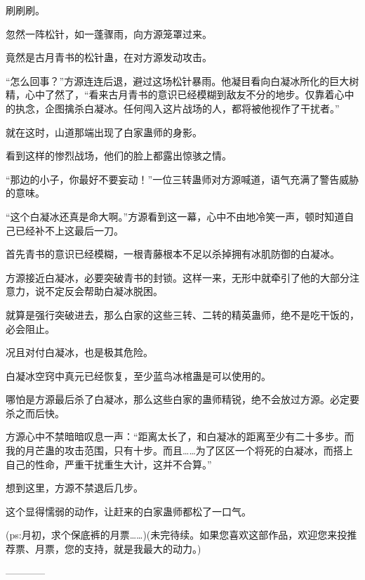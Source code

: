 \begin{this_body}
刷刷刷。

忽然一阵松针，如一蓬骤雨，向方源笼罩过来。

竟然是古月青书的松针蛊，在对方源发动攻击。

“怎么回事？”方源连连后退，避过这场松针暴雨。他凝目看向白凝冰所化的巨大树精，心中了然了，“看来古月青书的意识已经模糊到敌友不分的地步。仅靠着心中的执念，企图擒杀白凝冰。任何闯入这片战场的人，都将被他视作了干扰者。”

就在这时，山道那端出现了白家蛊师的身影。

看到这样的惨烈战场，他们的脸上都露出惊骇之情。

“那边的小子，你最好不要妄动！”一位三转蛊师对方源喊道，语气充满了警告威胁的意味。

“这个白凝冰还真是命大啊。”方源看到这一幕，心中不由地冷笑一声，顿时知道自己已经补不上这最后一刀。

首先青书的意识已经模糊，一根青藤根本不足以杀掉拥有冰肌防御的白凝冰。

方源接近白凝冰，必要突破青书的封锁。这样一来，无形中就牵引了他的大部分注意力，说不定反会帮助白凝冰脱困。

就算是强行突破进去，那么白家的这些三转、二转的精英蛊师，绝不是吃干饭的，必会阻止。

况且对付白凝冰，也是极其危险。

白凝冰空窍中真元已经恢复，至少蓝鸟冰棺蛊是可以使用的。

哪怕是方源最后杀了白凝冰，那么这些白家的蛊师精锐，绝不会放过方源。必定要杀之而后快。

方源心中不禁暗暗叹息一声：“距离太长了，和白凝冰的距离至少有二十多步。而我的月芒蛊的攻击范围，只有十步。而且……为了区区一个将死的白凝冰，而搭上自己的性命，严重干扰重生大计，这并不合算。”

想到这里，方源不禁退后几步。

这个显得懦弱的动作，让赶来的白家蛊师都松了一口气。

(ps:月初，求个保底裤的月票……)(未完待续。如果您喜欢这部作品，欢迎您来投推荐票、月票，您的支持，就是我最大的动力。)

------------

\end{this_body}

